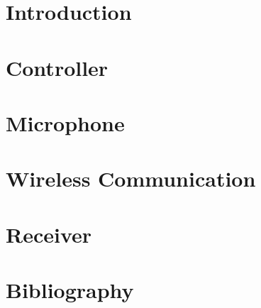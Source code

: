 \documentclass{article}
\begin{document}
	
	\newpage
	
	\tableofcontents
	\setcounter{page}{0}
	\newpage
	
	\section{Introduction}
	
	\newpage
	
	\section{Controller}
	
	\newpage
	
	\section{Microphone}
	
	\newpage
	
	\section{Wireless Communication}
	
	\newpage
	
	\section{Receiver}
	
	\newpage
	
	\section{Bibliography}
	
	\newpage
	
	
\end{document}
